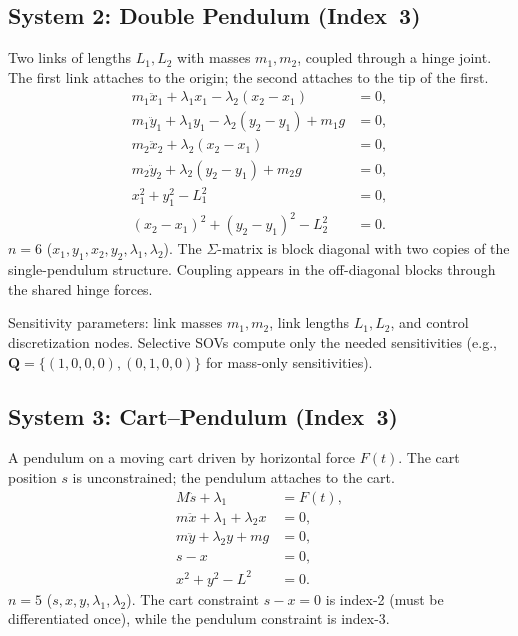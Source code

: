 \documentclass[12pt,a4paper]{article}
\theoremstyle{definition}
\theoremstyle{plain}
\newcommand{\vQ}{\mathbf{Q}}
\begin{document}
\subsection{System 2: Double Pendulum (Index~3)}

Two links of lengths $L_1, L_2$ with masses $m_1, m_2$, coupled through a hinge joint. The first link attaches to the origin; the second attaches to the tip of the first.
\begin{equation}
  \begin{aligned}
    m_1\ddot{x}_1 + \lambda_1 x_1 - \lambda_2(x_2-x_1) &= 0,\\
    m_1\ddot{y}_1 + \lambda_1 y_1 - \lambda_2(y_2-y_1) + m_1 g &= 0,\\
    m_2\ddot{x}_2 + \lambda_2(x_2-x_1) &= 0,\\
    m_2\ddot{y}_2 + \lambda_2(y_2-y_1) + m_2 g &= 0,\\
    x_1^2 + y_1^2 - L_1^2 &= 0,\\
    (x_2-x_1)^2 + (y_2-y_1)^2 - L_2^2 &= 0.
  \end{aligned}
\end{equation}
$n=6$ ($x_1,y_1,x_2,y_2,\lambda_1,\lambda_2$). The $\Sigma$-matrix is block diagonal with two copies of the single-pendulum structure. Coupling appears in the off-diagonal blocks through the shared hinge forces.

Sensitivity parameters: link masses $m_1,m_2$, link lengths $L_1,L_2$, and control discretization nodes. Selective SOVs compute only the needed sensitivities (e.g., $\vQ = \{(1,0,0,0),(0,1,0,0)\}$ for mass-only sensitivities).

\subsection{System 3: Cart--Pendulum (Index~3)}

A pendulum on a moving cart driven by horizontal force $F(t)$. The cart position $s$ is unconstrained; the pendulum attaches to the cart.
\begin{equation}
  \begin{aligned}
    M\ddot{s} + \lambda_1 &= F(t),\\
    m\ddot{x} + \lambda_1 + \lambda_2 x &= 0,\\
    m\ddot{y} + \lambda_2 y + mg &= 0,\\
    s - x &= 0,\\
    x^2 + y^2 - L^2 &= 0.
  \end{aligned}
\end{equation}
$n=5$ ($s,x,y,\lambda_1,\lambda_2$). The cart constraint $s-x=0$ is index-2 (must be differentiated once), while the pendulum constraint is index-3.
\end{document}
